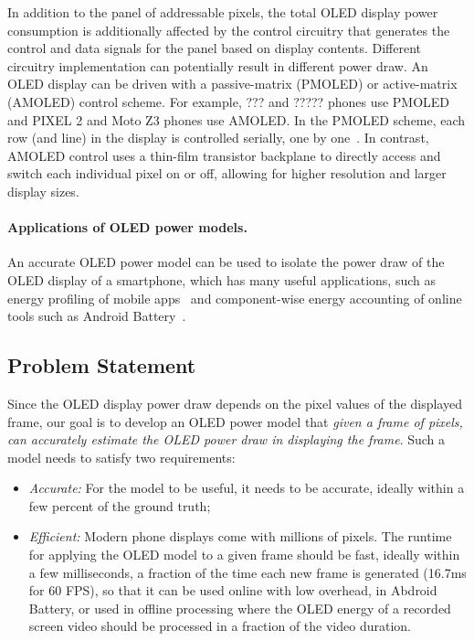 In addition to the panel of addressable pixels, the total OLED display
power consumption is additionally affected by the control circuitry
that generates the control and data signals for the panel based on
display contents. Different circuitry implementation can potentially
result in different power draw.
{An OLED display can be driven with a passive-matrix (PMOLED) or
active-matrix (AMOLED) control scheme.  For example, ??? and ?????
phones use PMOLED and PIXEL 2 and Moto Z3 phones use AMOLED. In the PMOLED
scheme, each row (and line) in the display is controlled serially, one
by one~\cite{pmoled:amoled}. In contrast, AMOLED control uses a
thin-film transistor backplane to directly access and switch each
individual pixel on or off, allowing for higher resolution and larger
display sizes.
}
\fi

\paragraph{Applications of OLED power models.}
An accurate OLED power model can be used to isolate the power draw of
the OLED display of a smartphone, which has many useful applications,
such as energy profiling of mobile
apps~\cite{appscope,zhang2010accurate,shye2009into,pathak:eurosys12,mittal:mobicom12}
and component-wise energy accounting of online tools such as Android
Battery~\cite{???}.
\fi

\subsection{Problem Statement}
\label{subsec:problem}

Since the OLED display power draw depends on the pixel values of the
displayed frame, our goal is to develop an OLED power model that {\em
  given a frame of pixels, can accurately estimate the OLED power draw
  in displaying the frame}.  Such a model needs to satisfy two
requirements:
  \begin{itemize}[leftmargin=*]
\item {\em Accurate:} For the model to be useful, it needs to be accurate, ideally within a few percent
of the ground truth;
\item {\em Efficient:} Modern phone displays come with millions of pixels.
The runtime for applying the OLED model to a given
frame should be fast, ideally within a few milliseconds, \ie a fraction of
the time each new frame is generated (16.7ms for 60 FPS),
so that it can be used online with low overhead, \eg in Abdroid Battery,
or used in offline processing where the OLED energy of a recorded screen video
should be processed in a fraction of the video duration.
\end{itemize}
  \fi
  

